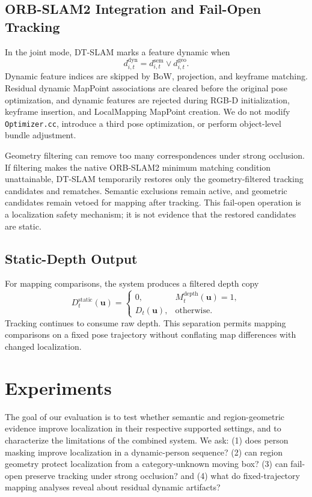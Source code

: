 \documentclass[10pt]{article}
\begin{document}
\subsection{ORB-SLAM2 Integration and Fail-Open Tracking}

In the joint mode, DT-SLAM marks a feature dynamic when
\begin{equation}
d_{i,t}^{\mathrm{dyn}}=d_{i,t}^{\mathrm{sem}}\lor d_{i,t}^{\mathrm{geo}}.
\end{equation}
Dynamic feature indices are skipped by BoW, projection, and keyframe matching. Residual dynamic MapPoint associations are cleared before the original pose optimization, and dynamic features are rejected during RGB-D initialization, keyframe insertion, and LocalMapping MapPoint creation. We do not modify \texttt{Optimizer.cc}, introduce a third pose optimization, or perform object-level bundle adjustment.

Geometry filtering can remove too many correspondences under strong occlusion. If filtering makes the native ORB-SLAM2 minimum matching condition unattainable, DT-SLAM temporarily restores only the geometry-filtered tracking candidates and rematches. Semantic exclusions remain active, and geometric candidates remain vetoed for mapping after tracking. This fail-open operation is a localization safety mechanism; it is not evidence that the restored candidates are static.

\subsection{Static-Depth Output}

For mapping comparisons, the system produces a filtered depth copy
\begin{equation}
D_t^{\mathrm{static}}(\mathbf{u})=
\begin{cases}
0, & M_t^{\mathrm{depth}}(\mathbf{u})=1,\\
D_t(\mathbf{u}), & \text{otherwise}.
\end{cases}
\end{equation}
Tracking continues to consume raw depth. This separation permits mapping comparisons on a fixed pose trajectory without conflating map differences with changed localization.

\section{Experiments}

The goal of our evaluation is to test whether semantic and region-geometric evidence improve localization in their respective supported settings, and to characterize the limitations of the combined system. We ask: (1) does person masking improve localization in a dynamic-person sequence? (2) can region geometry protect localization from a category-unknown moving box? (3) can fail-open preserve tracking under strong occlusion? and (4) what do fixed-trajectory mapping analyses reveal about residual dynamic artifacts?
\end{document}
